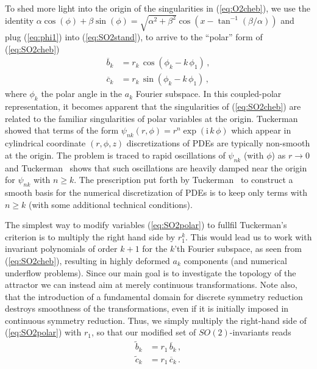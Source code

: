 \documentclass[aip,cha,showpacs,twocolumn, 
 		  reprint]{revtex4-1} %
\newcommand{\bseq}{\begin{subequations}}
\newcommand{\eseq}{\end{subequations}}
\newcommand{\rf}     [1] {~\cite{#1}}
\newcommand{\refeq}  [1] {(\ref{#1})}
\newcommand{\ii}{\ensuremath{\mathrm{i}}} %
\begin{document}
To shed more light into the origin of the singularities in \refeq{eq:O2cheb}, 
we use the identity 
$\alpha\cos(\phi)+\beta\sin(\phi)=\sqrt{\alpha^2+\beta^2}\cos(x-\tan^{-1}(\beta/\alpha))$
and plug \refeq{eq:phi1} into \refeq{eq:SO2stand}, to arrive to the
``polar'' form of \refeq{eq:SO2cheb}
\bseq\label{eq:SO2polar}
  \begin{align}
    \overline{b}_k &= 
		    r_k\, \cos(\phi_k-k\,\phi_1)\,, \label{eq:SO2polar1}\\
    \overline{c}_k &=
		    r_k\, \sin(\phi_k-k\,\phi_1)\,,\label{eq:SO2polar2}
  \end{align}
\eseq
where $\phi_k$ the polar angle in the $a_k$ Fourier subspace. In this coupled-polar
representation, it becomes apparent that the singularities of \refeq{eq:SO2cheb}
are related to the familiar singularities of polar variables at the origin.
Tuckerman\rf{tuckerman89} showed that terms of the form $\psi_{nk}(r,\phi)=r^n\exp(\ii\, k\,\phi)$ 
which appear in cylindrical coordinate $(r,\phi,z)$ discretizations of PDEs 
are typically non-smooth at the origin. The problem is traced to rapid 
oscillations of $\psi_{nk}$ (with $\phi$) as $r\rightarrow0$ and Tuckerman\rf{tuckerman89} shows
that such oscillations are heavily damped near the origin for
$\psi_{nk}$ with $n\geq k$. The prescription put forth by Tuckerman\rf{tuckerman89} to 
construct a smooth basis for the numerical discretization of
PDEs is to keep only terms with $n\geq k$ 
(with some additional technical conditions).

The simplest way to modify variables \refeq{eq:SO2polar} to fullfil Tuckerman's
criterion is to multiply the right hand side by $r_1^k$. This would lead us to 
work with invariant polynomials of order $k+1$ for the $k$'th Fourier subspace, 
as seen from \refeq{eq:SO2cheb}, resulting in highly deformed $a_k$ components
(and numerical underflow problems). Since our main goal is to investigate the
topology of the attractor we can instead aim at merely continuous transformations.
Note also, that the introduction of a fundamental domain for discrete symmetry
reduction destroys smoothness of the transformations, even if it is initially
imposed in continuous symmetry reduction.
Thus, we simply multiply the right-hand side of \refeq{eq:SO2polar} with $r_1$,
so that our modified set of $SO(2)$-invariants reads
\bseq\label{eq:SO2polarCont}
  \begin{align}
    \tilde{b}_k &= 
		    r_1\,\overline{b}_k\,, \label{eq:SO2polarCont1}\\
    \tilde{c}_k &=
		    r_1\,\overline{c}_k\,.\label{eq:SO2polarCont2}
  \end{align}
\eseq
\end{document}
